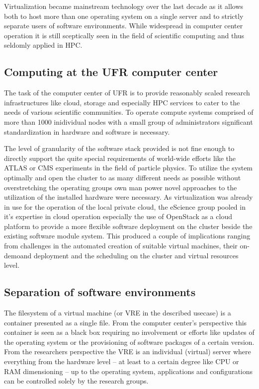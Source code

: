Virtualization became mainstream technology over the last decade as it allows
both to host more than one operating system on a single server and to strictly
separate users of software environments. While widespread in computer center
operation it is still sceptically seen in the field of scientific computing and
thus seldomly applied in HPC.

\subsection{Computing at the UFR computer center}

The task of the computer center of UFR is to provide reasonably scaled research
infrastructures like cloud, storage and especially HPC services to cater to the
needs of various scientific communities. To operate compute systems comprised of
more than 1000 inidividual nodes with a small group of administrators
significant standardization in hardware and software is necessary.

The level of granularity of the software stack provided is not fine enough to
directly support the quite special requirements of world-wide efforts like the
ATLAS or CMS experiments in the field of particle physics. To utilize the system
optimally and open the cluster to as many different needs as possible without
overstretching the operating groups own man power novel approaches to the
utilization of the installed hardware were necessary. As virtualization was
already in use for the operation of the local private cloud, the eScience group
pooled in it's expertise in cloud operation especially the use of OpenStack as a
cloud platform to provide a more flexible software deployment on the cluster
beside the existing software module system. This produced a couple of
implications ranging from challenges in the automated creation of suitable
virtual machines, their on-demoand deployment and the scheduling on the cluster
and virtual resources level.

\subsection{Separation of software environments}

The filesystem of a virtual machine (or VRE in the described usecase) is a
container presented as a single file. From the computer center's perspective
this container is seen as a black box requiring no involvement or efforts like
updates of the operating system or the provisioning of software packages of a
certain version. From the researchers perspective the VRE is an individual
(virtual) server where everything from the hardware level -- at least to a
certain degree like CPU or RAM dimensioning -- up to the operating system,
applications and configurations can be controlled solely by the research groups.

